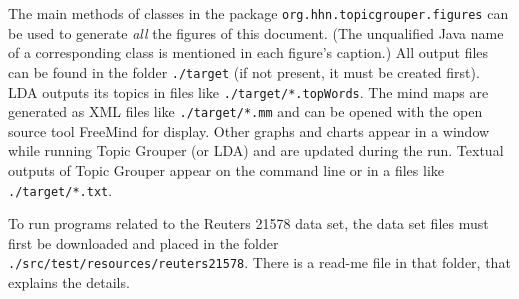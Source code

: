 \documentclass[10pt, a4paper, oneside]{article}
\begin{document}
The main methods of classes in the package \texttt{org.hhn.topicgrouper.figures} can be used to generate \emph{all} the figures of this document.
(The unqualified Java name of a corresponding class is mentioned in each figure's caption.)
All output files can be found in the folder \texttt{./target} (if not present, it must be created first).
LDA outputs its topics in files like \texttt{./target/*.topWords}.
The mind maps are generated as XML files like \texttt{./target/*.mm} and can be opened with the open source tool FreeMind for display.
Other graphs and charts appear in a window while running Topic Grouper (or LDA) and are updated during the run.
Textual outputs of Topic Grouper appear on the command line or in a files like \texttt{./target/*.txt}.

To run programs related to the Reuters 21578 data set, the data set files must first be downloaded and placed in the folder
\texttt{./src/test/resources/reuters21578}. There is a read-me file in that folder, that explains the details.

\nocite{*} %
\end{document}
